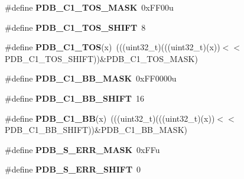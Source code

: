 \begin{DoxyCompactItemize}
\item 
\#define {\bfseries P\+D\+B\+\_\+\+C1\+\_\+\+T\+O\+S\+\_\+\+M\+A\+SK}~0x\+F\+F00u\hypertarget{group__PDB__Register__Masks_gabc4c3ddddcd8ab8629495457629a560e}{}\label{group__PDB__Register__Masks_gabc4c3ddddcd8ab8629495457629a560e}

\item 
\#define {\bfseries P\+D\+B\+\_\+\+C1\+\_\+\+T\+O\+S\+\_\+\+S\+H\+I\+FT}~8\hypertarget{group__PDB__Register__Masks_ga5f76b81da95cec6cc1dcbd761e48d32f}{}\label{group__PDB__Register__Masks_ga5f76b81da95cec6cc1dcbd761e48d32f}

\item 
\#define {\bfseries P\+D\+B\+\_\+\+C1\+\_\+\+T\+OS}(x)~(((uint32\+\_\+t)(((uint32\+\_\+t)(x))$<$$<$P\+D\+B\+\_\+\+C1\+\_\+\+T\+O\+S\+\_\+\+S\+H\+I\+FT))\&P\+D\+B\+\_\+\+C1\+\_\+\+T\+O\+S\+\_\+\+M\+A\+SK)\hypertarget{group__PDB__Register__Masks_gae5c193c9c001f33a49f1ae3c2a11133c}{}\label{group__PDB__Register__Masks_gae5c193c9c001f33a49f1ae3c2a11133c}

\item 
\#define {\bfseries P\+D\+B\+\_\+\+C1\+\_\+\+B\+B\+\_\+\+M\+A\+SK}~0x\+F\+F0000u\hypertarget{group__PDB__Register__Masks_ga4e6f86caa6df500cedef06d1638194ca}{}\label{group__PDB__Register__Masks_ga4e6f86caa6df500cedef06d1638194ca}

\item 
\#define {\bfseries P\+D\+B\+\_\+\+C1\+\_\+\+B\+B\+\_\+\+S\+H\+I\+FT}~16\hypertarget{group__PDB__Register__Masks_gadd4b49047fcd1a75374752c012a931d8}{}\label{group__PDB__Register__Masks_gadd4b49047fcd1a75374752c012a931d8}

\item 
\#define {\bfseries P\+D\+B\+\_\+\+C1\+\_\+\+BB}(x)~(((uint32\+\_\+t)(((uint32\+\_\+t)(x))$<$$<$P\+D\+B\+\_\+\+C1\+\_\+\+B\+B\+\_\+\+S\+H\+I\+FT))\&P\+D\+B\+\_\+\+C1\+\_\+\+B\+B\+\_\+\+M\+A\+SK)\hypertarget{group__PDB__Register__Masks_ga5e17c540740d6900e1a1184dd0c21e69}{}\label{group__PDB__Register__Masks_ga5e17c540740d6900e1a1184dd0c21e69}

\item 
\#define {\bfseries P\+D\+B\+\_\+\+S\+\_\+\+E\+R\+R\+\_\+\+M\+A\+SK}~0x\+F\+Fu\hypertarget{group__PDB__Register__Masks_ga544472023dc6de6708b210d54d64c69c}{}\label{group__PDB__Register__Masks_ga544472023dc6de6708b210d54d64c69c}

\item 
\#define {\bfseries P\+D\+B\+\_\+\+S\+\_\+\+E\+R\+R\+\_\+\+S\+H\+I\+FT}~0\hypertarget{group__PDB__Register__Masks_ga3b10142858bded9ff7916076433dbcb6}{}\label{group__PDB__Register__Masks_ga3b10142858bded9ff7916076433dbcb6}


\end{DoxyCompactItemize}

